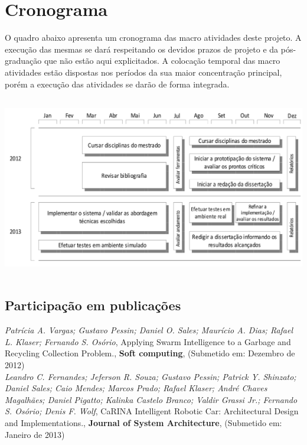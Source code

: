 
\chapter{Cronograma} 
\label{cap:cronograma}

O quadro abaixo apresenta um cronograma das macro atividades deste projeto. A
execução das mesmas se dará respeitando os devidos prazos de projeto e da
pós-graduação que não estão aqui explicitados. A colocação temporal das macro
atividades estão dispostas nos períodos da sua maior concentração principal,
porém a execução das atividades se darão de forma integrada.

\includegraphics[width=16cm,height=8cm]{images/chrono.png}

\section{Participação em publicações}

\textit{Patrícia A. Vargas; Gustavo Pessin; Daniel O. Sales; Maurício A. Dias;
Rafael L. Klaser; Fernando S. Osório},
Applying Swarm Intelligence to a Garbage and Recycling Collection Problem.,
\textbf{Soft computing}, (Submetido em: Dezembro de 2012)
\\

\textit{Leandro C. Fernandes; Jeferson R. Souza; Gustavo Pessin; Patrick Y.
Shinzato; Daniel Sales; Caio Mendes; Marcos Prado; Rafael Klaser; André Chaves
Magalhães; Daniel Pigatto; Kalinka Castelo Branco; Valdir Grassi Jr.; Fernando
S. Osório; Denis F. Wolf},
CaRINA Intelligent Robotic Car:
Architectural Design and Implementations., \textbf{Journal of System
Architecture}, (Submetido em: Janeiro de 2013)
